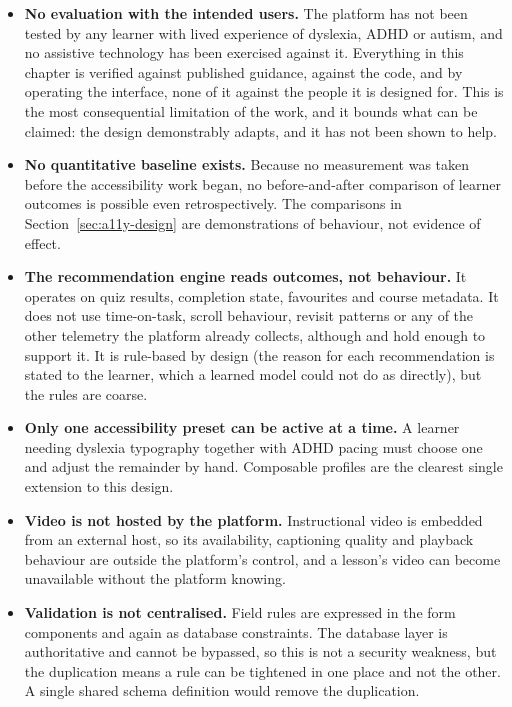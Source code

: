 \documentclass[12pt, oneside]{article} %
\newcommand{\tcode}[1]{\path{#1}}
\begin{document}
\begin{itemize}
    \item \textbf{No evaluation with the intended users.} The platform has not been tested by any learner with lived experience of dyslexia, ADHD or autism, and no assistive technology has been exercised against it. Everything in this chapter is verified against published guidance, against the code, and by operating the interface, none of it against the people it is designed for. This is the most consequential limitation of the work, and it bounds what can be claimed: the design demonstrably adapts, and it has not been shown to help.

    \item \textbf{No quantitative baseline exists.} Because no measurement was taken before the accessibility work began, no before-and-after comparison of learner outcomes is possible even retrospectively. The comparisons in Section~\ref{sec:a11y-design} are demonstrations of behaviour, not evidence of effect.

    \item \textbf{The recommendation engine reads outcomes, not behaviour.} It operates on quiz results, completion state, favourites and course metadata. It does not use time-on-task, scroll behaviour, revisit patterns or any of the other telemetry the platform already collects, although \tcode{lesson_progress} and \tcode{adaptive_interactions} hold enough to support it. It is rule-based by design (the reason for each recommendation is stated to the learner, which a learned model could not do as directly), but the rules are coarse.

    \item \textbf{Only one accessibility preset can be active at a time.} A learner needing dyslexia typography together with ADHD pacing must choose one and adjust the remainder by hand. Composable profiles are the clearest single extension to this design.

    \item \textbf{Video is not hosted by the platform.} Instructional video is embedded from an external host, so its availability, captioning quality and playback behaviour are outside the platform's control, and a lesson's video can become unavailable without the platform knowing.

    \item \textbf{Validation is not centralised.} Field rules are expressed in the form components and again as database constraints. The database layer is authoritative and cannot be bypassed, so this is not a security weakness, but the duplication means a rule can be tightened in one place and not the other. A single shared schema definition would remove the duplication.


\end{itemize}
\end{document}

